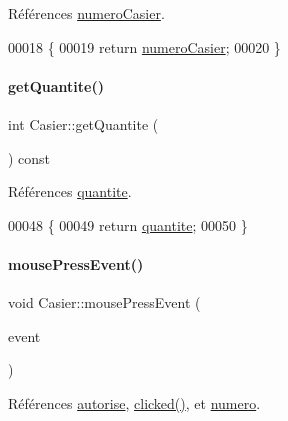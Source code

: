 Références \hyperlink{class_casier_abc4e6c9bde55c9b703ea53d85b6b1219}{numero\+Casier}.


\begin{DoxyCode}
00018 \{
00019     \textcolor{keywordflow}{return} \hyperlink{class_casier_abc4e6c9bde55c9b703ea53d85b6b1219}{numeroCasier};
00020 \}
\end{DoxyCode}
\mbox{\label{class_casier_ad4b3ee57fdc7240b2a895b7f70f4cd11}} 
\paragraph{\texorpdfstring{get\+Quantite()}{getQuantite()}}
{\footnotesize\ttfamily int Casier\+::get\+Quantite (\begin{DoxyParamCaption}{ }\end{DoxyParamCaption}) const}



Références \hyperlink{class_casier_acf950b0ab2ee437a9dbc8c6b66432b4c}{quantite}.


\begin{DoxyCode}
00048 \{
00049     \textcolor{keywordflow}{return} \hyperlink{class_casier_acf950b0ab2ee437a9dbc8c6b66432b4c}{quantite};
00050 \}
\end{DoxyCode}
\mbox{\label{class_casier_ad12cf89b6a99254f529997003adcf029}} 
\paragraph{\texorpdfstring{mouse\+Press\+Event()}{mousePressEvent()}}
{\footnotesize\ttfamily void Casier\+::mouse\+Press\+Event (\begin{DoxyParamCaption}\item[{Q\+Mouse\+Event $\ast$}]{event }\end{DoxyParamCaption})}



Références \hyperlink{class_casier_a2dd9fbe4a93685080a9b5c8f69e3f29a}{autorise}, \hyperlink{class_casier_a6f147d5151d266424cc84b114ccf073b}{clicked()}, et \hyperlink{class_casier_a17aa23e73b177559266a9fb17f63b812}{numero}.


